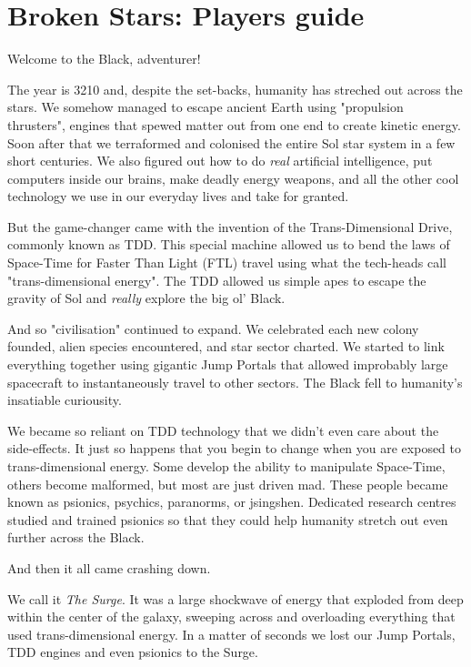 \documentclass[10pt,twoside]{article}
\begin{document}
  \section*{Broken Stars: Players guide}

  \begin{multicols}{2}

  \addtocounter{section}{1}

  Welcome to the Black, adventurer!

  The year is 3210 and, despite the set-backs, humanity has streched out across the stars. We somehow managed to escape ancient Earth using "propulsion thrusters", engines that spewed matter out from one end to create kinetic energy. Soon after that we terraformed and colonised the entire Sol star system in a few short centuries. We also figured out how to do \textit{real} artificial intelligence, put computers inside our brains, make deadly energy weapons, and all the other cool technology we use in our everyday lives and take for granted.

  But the game-changer came with the invention of the Trans-Dimensional Drive, commonly known as TDD. This special machine allowed us to bend the laws of Space-Time for Faster Than Light (FTL) travel using what the tech-heads call "trans-dimensional energy". The TDD allowed us simple apes to escape the gravity of Sol and \textit{really} explore the big ol' Black.

  And so "civilisation" continued to expand. We celebrated each new colony founded, alien species encountered, and star sector charted. We started to link everything together using gigantic Jump Portals that allowed improbably large spacecraft to instantaneously travel to other sectors. The Black fell to humanity's insatiable curiousity.

  We became so reliant on TDD technology that we didn't even care about the side-effects. It just so happens that you begin to change when you are exposed to trans-dimensional energy. Some develop the ability to manipulate Space-Time, others become malformed, but most are just driven mad. These people became known as psionics, psychics, paranorms, or jsingshen. Dedicated research centres studied and trained psionics so that they could help humanity stretch out even further across the Black.

  And then it all came crashing down.

  We call it \textit{The Surge}. It was a large shockwave of energy that exploded from deep within the center of the galaxy, sweeping across and overloading everything that used trans-dimensional energy. In a matter of seconds we lost our Jump Portals, TDD engines and even psionics to the Surge.


\end{multicols}
\end{document}
